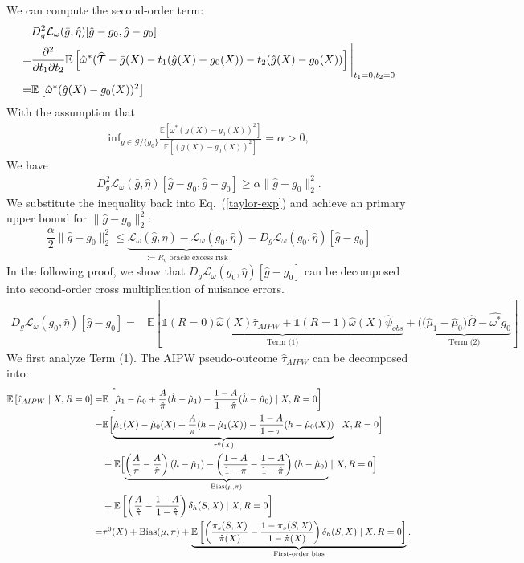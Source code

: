\documentclass{article}
\theoremstyle{plain}
\theoremstyle{definition}
\theoremstyle{remark}
\newcommand{\E}{\mathbb{E}}                %
\newcommand{\1}{\mathds{1}}                %
\begin{document}
We can compute the second-order term:
\begin{align}
    &D_g^2\mathcal{L}_\omega(\bar{g}, \hat\eta)[\hat{g}-g_0, \hat{g}-g_0] \notag \\
    =& \frac{\partial^2}{\partial t_1\partial t_2} \E\left[\hat\omega^* (\widehat{\mathcal{T}} - \bar{g}(X)-t_1(\hat{g}(X)- g_0(X)) - t_2(\hat{g}(X) - g_0(X))\right] \Bigg |_{t_1=0,t_2=0} \notag \\
    =& \E\left[\hat\omega^* (\hat{g}(X) - g_0(X))^2\right]
\end{align}
With the assumption that
\begin{align}
    \text{inf}_{g \in \mathcal{G}/\{g_0\}} \frac{\E\left[\omega^* (g(X) - g_0(X))^2\right]}{\E\left[(g(X) - g_0(X))^2\right]} = \alpha > 0,
\end{align}
We have 
\begin{align}
    D_g^2\mathcal{L}_\omega(\bar{g}, \hat\eta)[\hat{g}-g_0, \hat{g}-g_0] \geq  \alpha \|\hat{g}-g_0\|_2^2.
\end{align}
We substitute the inequality back into Eq.~(\ref{taylor-exp}) and achieve an primary upper bound for $\|\hat{g}-g_0\|_2^2$:
\begin{equation}
\label{initial-bound}
    \frac{\alpha}{2} \|\hat{g}-g_0\|_2^2 \leq \underbrace{\mathcal{L}_\omega(\hat{g}, \hat{\eta}) - \mathcal{L}_\omega(g_0, \hat{\eta})}_{:=R_g \text{ oracle excess risk}} - D_g\mathcal{L}_\omega(g_0, \hat{\eta})[\hat{g} - g_0]
\end{equation}
In the following proof, we show that $D_g\mathcal{L}_\omega(g_0, \hat{\eta})[\hat{g} - g_0]$ can be decomposed into second-order cross multiplication of nuisance errors.
\begin{align}
    D_g\mathcal{L}_\omega(g_0, \hat{\eta})[\hat{g} - g_0]=& \E\left[ \underbrace{\1(R=0) \hat{\omega}(X) \hat{\tau}_{AIPW} + \1(R=1) \hat{\omega}(X) \hat\psi_{obs}}_{\text{Term (1)}} + \underbrace{\big( (\hat\mu_1-\hat\mu_0\big) \hat{\Omega} - \hat{\omega^*}g_0}_{\text{Term (2)}}\right]
\end{align}
We first analyze Term (1). The AIPW pseudo-outcome $\hat{\tau}_{AIPW}$ can be decomposed into:
\begin{align}
    \E\left[\hat{\tau}_{AIPW} \mid X, R = 0\right] = & \E\left[ \hat{\mu}_1 - \hat{\mu}_0 + \frac{A}{\hat{\pi}}(\hat{h} - \hat{\mu}_1) - \frac{1-A}{1-\hat{\pi}}(\hat{h} - \hat{\mu}_0) \mid X, R=0 \right] \notag \\
    =& \E\Bigl[\underbrace{\hat{\mu}_1(X) - \hat{\mu}_0(X) + \frac{A}{\pi}(h-\hat\mu_1(X)) - \frac{1-A}{1-\pi}(h-\hat\mu_0(X))}_{\tau^0(X)}\mid X, R = 0\Bigr] \\ &+ \E\Bigl[\underbrace{\left(\frac{A}{\pi} -\frac{A}{\hat\pi}\right)(h-\hat{\mu}_1) - \left(\frac{1-A}{1-\pi} -\frac{1-A}{1-\hat\pi}\right)(h-\hat{\mu}_0)}_{\text{Bias}(\mu, \pi)}\mid X, R = 0\Bigr] \\
    &+ \E\left[ \left(\frac{A}{\hat{\pi}} - \frac{1-A}{1-\hat{\pi}}\right) \delta_h(S,X) \mid X, R=0 \right] \notag \\
    =& \tau^0(X) + \text{Bias}(\mu, \pi) + \underbrace{\E\left[ \left( \frac{\pi_s(S,X)}{\hat{\pi}(X)} - \frac{1-\pi_s(S,X)}{1-\hat{\pi}(X)} \right) \delta_h(S,X) \mid X, R=0 \right]}_{\text{First-order bias}}.
\end{align}
\end{document}

